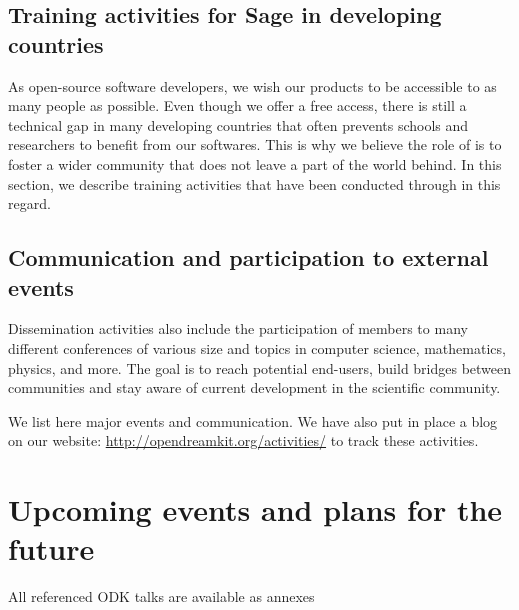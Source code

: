 \documentclass{deliverablereport}
\begin{document}










\subsection{Training activities for Sage in developing countries}

As open-source software developers, we wish our products
to be accessible to as many people as possible. Even though we offer
 a free access, there is still a technical gap in many 
developing countries that 
often prevents schools and researchers to benefit from our softwares.
This is why we believe the role of \ODK is to foster 
a wider community that does not leave a part of the world behind. In 
this section, we describe training activities that have been conducted 
through \ODK in this regard.




\subsection{Communication and participation to external events}

Dissemination activities also include the participation of \ODK
members to many different conferences of various size and topics
in computer science, mathematics, physics, and more. The goal is
to reach potential end-users, build bridges between communities and stay aware 
of current development in the scientific community.

We list here major events and communication. We have also put in place
a blog on our website: \url{http://opendreamkit.org/activities/} to track
these activities.






\section{Upcoming events and plans for the future}


\newpage\printbibliography

{\footnotesize All referenced ODK talks are available as annexes}
\end{document}
